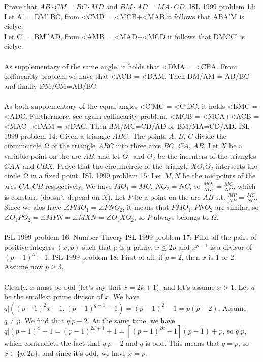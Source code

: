 Prove that $AB \cdot CM = BC \cdot MD$ and $BM \cdot AD = MA \cdot CD.$ 
ISL 1999 problem 13:  Let A' = DM^BC, from <CMD = <MCB+<MAB it follows that ABA'M is ciclyc. \\
Let C' = BM^AD, from <AMB = <MAD+<MCD it follows that DMCC' is ciclyc. \\\\
As supplementary of the same angle, it holds that <DMA = <CBA. From collinearity problem we have that <ACB = <DAM. Then DM/AM = AB/BC and finally DM/CM=AB/BC. \\\\
As both supplementary of the equal angles <C'MC = <C'DC, it holds <BMC = <ADC.  Furthermore, see again collinearity problem, <MCB = <MCA+<ACB = <MAC+<DAM = <DAC. Then BM/MC=CD/AD or BM/MA=CD/AD. 
ISL 1999 problem 14:  Given a triangle $ABC$. The points $A$, $B$, $C$ divide the circumcircle $\Omega$ of the triangle $ABC$ into three arcs $BC$, $CA$, $AB$. Let $X$ be a variable point on the arc $AB$, and let $O_1$ and $O_2$ be the incenters of the triangles $CAX$ and $CBX$. Prove that the circumcircle of the triangle $XO_1O_2$ intersects the circle $\Omega$ in a fixed point. 
ISL 1999 problem 15:  Let $M,N$ be the midpoints of the arcs $CA,CB$ respectively. We have $MO_1=MC,\ NO_2=NC$, so $\frac{MO_1}{NO_2}=\frac{MC}{NC}$, which is constant (doesn't depend on $X$). Let $P$ be a point on the arc $AB$ s.t. $\frac{MP}{NP}=\frac{MC}{NC}$. Since we alos have $\angle PMO_1=\angle PNO_2$, it means that $PMO_1,PNO_2$ are similar, so $\angle O_1PO_2=\angle MPN=\angle MXN=\angle O_1XO_2$, so $P$ always belongs to $\Omega$. \\\\
[Moderator edit: This problem has also been discussed at http://www.mathlinks.ro/Forum/viewtopic.php?t=555 .] 
ISL 1999 problem 16:  Number Theory 
ISL 1999 problem 17:  Find all the pairs of positive integers $(x,p)$ such that p is a prime, $x \leq 2p$ and $x^{p-1}$ is a divisor of $ (p-1)^x+1$. 
ISL 1999 problem 18:  First of all, if $p=2$, then $x$ is $1$ or $2$. Assume now $p\ge 3$. \\\\
Clearly, $x$ must be odd (let's say that $x=2k+1$), and let's assume $x>1$. Let $q$ be the smallest prime divisor of $x$. We have $q|((p-1)^2x-1,(p-1)^{q-1}-1)=(p-1)^2-1=p(p-2)$. Assume $q\ne p$. We find that $q|p-2$. At the same time, we have $q|(p-1)^x+1=(p-1)^{2k+1}+1=[(p-1)^{2k}-1](p-1)+p$, so $q|p$, which contradicts the fact that $q|p-2$ and $q$ is odd. This means that $q=p$, so $x\in\{p,2p\}$, and since it's odd, we have $x=p$. \\\\
